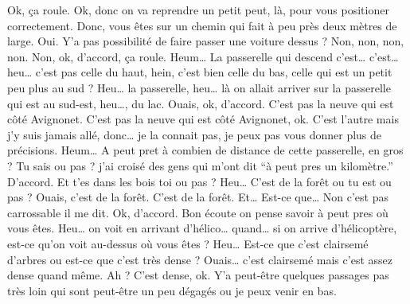 \begin{dialogue}
  \Sec {} Ok, ça roule.  Ok, donc on va reprendre un petit peut, là, pour vous positioner correctement. Donc, vous êtes sur un chemin qui fait à peu près deux mètres de large.
  \Req Oui.
  \Sec Y'a pas possibilité de faire passer une voiture dessus ?
  \Req Non, non, non, non.
  \Sec Non, ok, d'accord, ça roule. Heum… La passerelle qui descend c'est… c'est… heu… c'est pas celle du haut, hein, c'est bien celle du bas, celle qui est un petit peu plus au sud ?
  \Req Heu… la passerelle, heu… là on allait arriver sur la passerelle qui est au sud-est, heu…, du lac.
  \Sec Ouais, ok, d'accord.
  \Req C'est pas la neuve qui est côté Avignonet.
  \Sec C'est pas la neuve qui est côté Avignonet, ok.
  \Req C'est l'autre mais j'y suis jamais allé, donc… je la connait pas, je peux pas vous donner plus de précisions.
  \Sec Heum… A peut pret à combien de distance de cette passerelle, en gros ? Tu sais ou pas ?
  \Req j'ai croisé des gens qui m'ont dit \enquote{à peut pres un kilomètre.}
  \Sec D'accord. Et t'es dans les bois toi ou pas ?
  \Req Heu…
  \Sec C'est de la forêt ou tu est ou pas ?
  \Req Ouais, c'est de la forêt.
  \Sec C'est de la forêt. Et… Est-ce que…  Non c'est pas carrossable il me dit. Ok, d'accord.  Bon écoute on pense savoir à peut pres où vous êtes. Heu… on voit en arrivant d'hélico… quand… si on arrive d'hélicoptère, est-ce qu'on voit au-dessus où vous êtes ?
  \Req Heu…
  \Sec Est-ce que c'est clairsemé d'arbres ou est-ce que c'est très dense ?
  \Req Ouais… c'est clairsemé mais c'est assez dense quand même.
  \Sec Ah ? C'est dense, ok.
  \Sec Y'a peut-être quelques passages pas très loin qui sont peut-être un peu dégagés ou je peux venir en bas. 
\end{dialogue}
